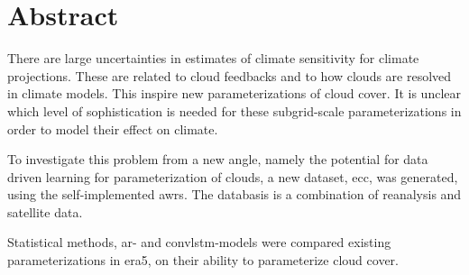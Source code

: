\chapter*{Abstract}

There are large uncertainties in estimates of climate sensitivity for climate projections. These are related to cloud feedbacks and to how clouds are resolved in climate models. This inspire new parameterizations of cloud cover. It is unclear which level of sophistication is needed for these subgrid-scale parameterizations in order to model their effect on climate.

To investigate this problem from a new angle, namely the potential for data driven learning for parameterization of clouds, a new dataset, \acrfull{ecc}, was generated, using the self-implemented \acrfull{awrs}. The databasis is a combination of reanalysis and satellite data. %

Statistical methods, \acrfull{ar}- and \acrfull{convlstm}-models were compared existing parameterizations in \acrshort{era5}, on their ability to parameterize cloud cover. 

